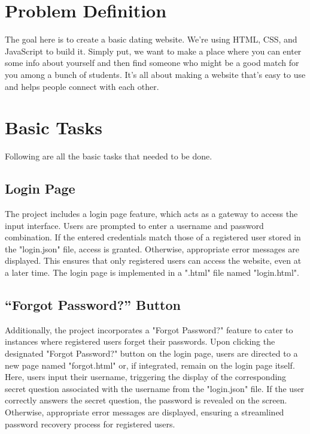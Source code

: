 \documentclass[12pt,a4paper]{article}
\begin{document}




\tableofcontents


\newpage
{} %

\section{Problem Definition}

The goal here is to create a basic dating website. We're using HTML, CSS, and JavaScript to build it. Simply put, we want to make a place where you can enter some info about yourself and then find someone who might be a good match for you among a bunch of students. It's all about making a website that's easy to use and helps people connect with each other.

\section{Basic Tasks}
Following are all the basic tasks that needed to be done.
\subsection{Login Page}
The project includes a login page feature, which acts as a gateway to access the input interface. Users are prompted to enter a username and password combination. If the entered credentials match those of a registered user stored in the "login.json" file, access is granted. Otherwise, appropriate error messages are displayed. This ensures that only registered users can access the website, even at a later time. The login page is implemented in a ".html" file named "login.html".
\subsection{“Forgot Password?” Button}
Additionally, the project incorporates a "Forgot Password?" feature to cater to instances where registered users forget their passwords. Upon clicking the designated "Forgot Password?" button on the login page, users are directed to a new page named "forgot.html" or, if integrated, remain on the login page itself. Here, users input their username, triggering the display of the corresponding secret question associated with the username from the "login.json" file. If the user correctly answers the secret question, the password is revealed on the screen. Otherwise, appropriate error messages are displayed, ensuring a streamlined password recovery process for registered users.
\end{document}
